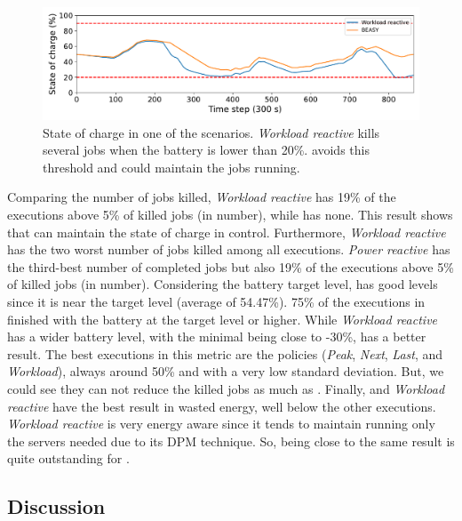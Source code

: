 \begin{figure}[!htb]
    \centering
    \includegraphics[scale=0.5]{Images/Heuristic/diff_state_of_charge.pdf}
    \caption{State of charge in one of the scenarios. \emph{Workload reactive} kills several jobs when the battery is lower than 20\%. \emph{\systemName} avoids this threshold and could maintain the jobs running.}
    \label{fig:soc_average}
\end{figure}

Comparing the number of jobs killed, \emph{Workload reactive} has 19\% of the executions above 5\% of killed jobs (in number), while \emph{\systemName} has none. This result shows that \emph{\systemName} can maintain the state of charge in control. Furthermore, \emph{Workload reactive} has the two worst number of jobs killed among all executions. \emph{Power reactive} has the third-best number of completed jobs but also 19\% of the executions above 5\% of killed jobs (in number). Considering the battery target level, \emph{\systemName} has good levels since it is near the target level (average of 54.47\%). 75\% of the executions in \emph{\systemName} finished with the battery at the target level or higher. While \emph{Workload reactive} has a wider battery level, with the minimal being close to -30\%, \emph{\systemName} has a better result. The best executions in this metric are the policies (\emph{Peak}, \emph{Next}, \emph{Last}, and \emph{Workload}), always around 50\% and with a very low standard deviation. But, we could see they can not reduce the killed jobs as much as \emph{\systemName}. Finally, \emph{\systemName} and \emph{Workload reactive} have the best result in wasted energy, well below the other executions. \emph{Workload reactive} is very energy aware since it tends to maintain running only the servers needed due to its DPM technique. So, being close to the same result is quite outstanding for \emph{\systemName}. 

\subsection{Discussion}

